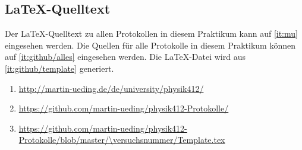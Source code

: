 \FloatBarrier
\begin{appendix}
    \FloatBarrier
    \chapter{\LaTeX-Quelltext}

    Der \LaTeX-Quelltext zu allen Protokollen in diesem Praktikum kann auf
    \ref{it:mu} eingesehen werden. Die Quellen für alle Protokolle in diesem
    Praktikum können auf \ref{it:github/alles} eingesehen werden. Die
    \LaTeX-Datei wird aus \ref{it:github/template} generiert.

    \begin{enumerate}
        \item
            \label{it:mu}
            \url{http://martin-ueding.de/de/university/physik412/}
        \item
            \label{it:github/alles}
            \url{https://github.com/martin-ueding/physik412-Protokolle/}
        \item
            \label{it:github/template}
            \url{https://github.com/martin-ueding/physik412-Protokolle/blob/master/\versuchsnummer/Template.tex}
    \end{enumerate}
\end{appendix}


\FloatBarrier
\printbibliography



